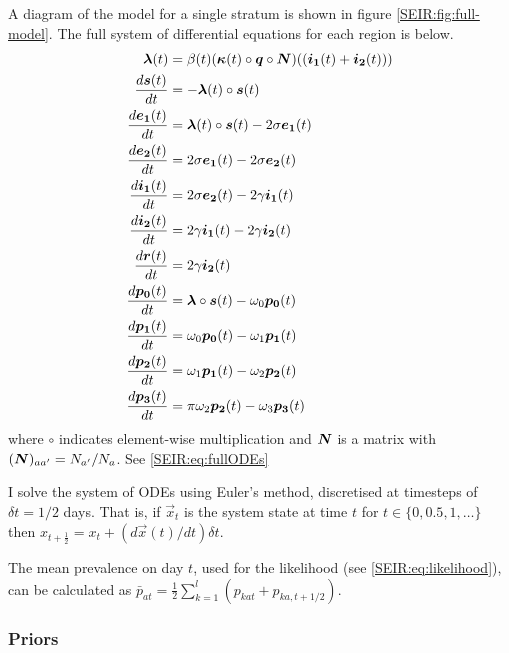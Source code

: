 \documentclass[thesis.tex]{subfiles}
\begin{document}
A diagram of the model for a single stratum is shown in figure \cref{SEIR:fig:full-model}.
The full system of differential equations for each region is below.
\begin{equation}
\begin{aligned}
    \bm{\lambda}(t) &= \beta(t) (\bm{\kappa}(t) \circ \bm{q} \circ \bm{N}) ((\bm{i_1}(t) + \bm{i_2}(t))) \\
    \frac{d\bm{s}(t)}{dt} &= -\bm{\lambda}(t) \circ \bm{s}(t) \\
    \frac{d\bm{e_1}(t)}{dt} &= \bm{\lambda}(t) \circ \bm{s}(t) - 2\sigma \bm{e_1}(t) \\
    \frac{d\bm{e_2}(t)}{dt} &= 2\sigma \bm{e_1}(t) - 2\sigma \bm{e_2}(t) \\
    \frac{d\bm{i_1}(t)}{dt} &= 2\sigma \bm{e_2}(t) - 2\gamma \bm{i_1}(t) \\
    \frac{d\bm{i_2}(t)}{dt} &= 2\gamma \bm{i_1}(t) - 2\gamma \bm{i_2}(t) \\
    \frac{d\bm{r}(t)}{dt} &= 2\gamma \bm{i_2}(t) \\
    \frac{d\bm{p_0}(t)}{dt} &= \bm{\lambda} \circ \bm{s}(t) - \omega_0 \bm{p_0}(t) \\
    \frac{d\bm{p_1}(t)}{dt} &= \omega_0 \bm{p_0}(t) - \omega_1 \bm{p_1}(t) \\
    \frac{d\bm{p_2}(t)}{dt} &= \omega_1 \bm{p_1}(t) - \omega_{2} \bm{p_2}(t) \\
    \frac{d\bm{p_3}(t)}{dt} &= \pi \omega_{2} \bm{p_2}(t) - \omega_{3} \bm{p_3}(t)
\end{aligned}
\label{SEIR:eq:fullODEs}
\end{equation}
where $\circ$ indicates element-wise multiplication and $\bm{N}$ is a matrix with $(\bm{N})_{aa'} = N_{a'} / N_{a}$.
See \cref{SEIR:eq:fullODEs}

I solve the system of ODEs using Euler's method, discretised at timesteps of $\delta t = 1/2$ days.
That is, if $\vec{x}_t$ is the system state at time $t$ for $t \in \{ 0, 0.5, 1, \dots \}$ then $x_{t+\frac{1}{2}} = x_t + (d\vec{x}(t)/dt) \delta t$.

The mean prevalence on day $t$, used for the likelihood (see \cref{SEIR:eq:likelihood}), can be calculated as $\bar{p}_{at} = \frac{1}{2} \sum_{k=1}^l ( p_{kat} + p_{ka,t+1/2} )$.

\subsubsection{Priors} \label{SEIR:sec:priors}
\end{document}
